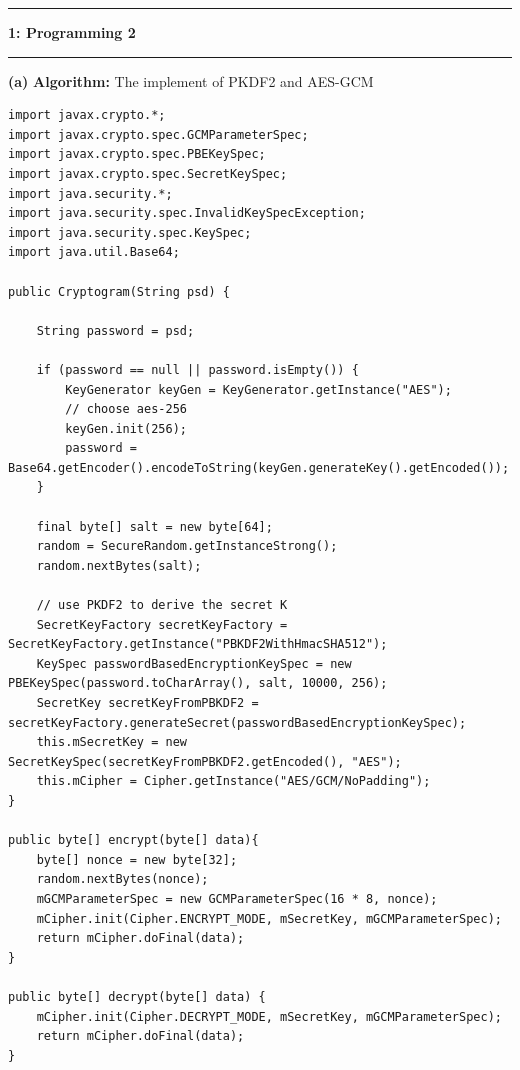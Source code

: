\documentclass[11pt]{article}
\newcommand\question[2]{\vspace{.25in}\hrule\textbf{#1: #2}\vspace{.5em}\hrule\vspace{.10in}}
\renewcommand\part[1]{\vspace{.10in}\textbf{(#1)}}
\newcommand\algorithm{\vspace{.10in}\textbf{Algorithm: }}
\begin{document}
\raggedright
\newcommand\NAME{Yao Xiao}  %
\newcommand\ANDREWID{2019180015}     %
\newcommand\HWNUM{2}              %


\question{1}{Programming 2} 

\part{a} \algorithm The implement of PKDF2 and AES-GCM
\begin{lstlisting}
import javax.crypto.*;
import javax.crypto.spec.GCMParameterSpec;
import javax.crypto.spec.PBEKeySpec;
import javax.crypto.spec.SecretKeySpec;
import java.security.*;
import java.security.spec.InvalidKeySpecException;
import java.security.spec.KeySpec;
import java.util.Base64;

public Cryptogram(String psd) {

    String password = psd;

    if (password == null || password.isEmpty()) {
        KeyGenerator keyGen = KeyGenerator.getInstance("AES");
        // choose aes-256
        keyGen.init(256);
        password = Base64.getEncoder().encodeToString(keyGen.generateKey().getEncoded());
    }

    final byte[] salt = new byte[64];
    random = SecureRandom.getInstanceStrong();
    random.nextBytes(salt);

    // use PKDF2 to derive the secret K
    SecretKeyFactory secretKeyFactory = SecretKeyFactory.getInstance("PBKDF2WithHmacSHA512");
    KeySpec passwordBasedEncryptionKeySpec = new PBEKeySpec(password.toCharArray(), salt, 10000, 256);
    SecretKey secretKeyFromPBKDF2 = secretKeyFactory.generateSecret(passwordBasedEncryptionKeySpec);
    this.mSecretKey = new SecretKeySpec(secretKeyFromPBKDF2.getEncoded(), "AES");
    this.mCipher = Cipher.getInstance("AES/GCM/NoPadding");
}

public byte[] encrypt(byte[] data){
    byte[] nonce = new byte[32];
    random.nextBytes(nonce);
    mGCMParameterSpec = new GCMParameterSpec(16 * 8, nonce);
    mCipher.init(Cipher.ENCRYPT_MODE, mSecretKey, mGCMParameterSpec);
    return mCipher.doFinal(data);
}

public byte[] decrypt(byte[] data) {
    mCipher.init(Cipher.DECRYPT_MODE, mSecretKey, mGCMParameterSpec);
    return mCipher.doFinal(data);
}

\end{lstlisting}
\end{document}
